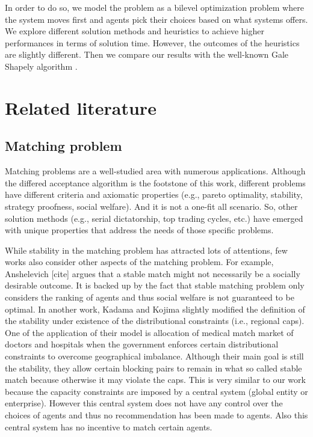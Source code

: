 \documentclass[11pt, letterpaper]{article}
\begin{document}
In order to do so, we model the problem as a bilevel optimization problem where the system moves first and agents pick their choices based on what systems offers. We explore different solution methods and heuristics to achieve higher performances in terms of solution time. However, the outcomes of the heuristics are slightly different. Then we compare our results with the well-known Gale Shapely algorithm \cite{gale1962college}.


\section{Related literature} \label {lit}
\subsection{Matching problem} 
Matching problems are a well-studied area with numerous applications. Although the differed acceptance algorithm \cite{gale1962college} is the footstone of this work, different problems have different criteria and axiomatic properties (e.g., pareto optimality, stability, strategy proofness, social welfare). And it is not a one-fit all scenario.  So, other solution methods (e.g., serial dictatorship, top trading cycles, etc.) have emerged with unique properties that address the needs of those specific problems. 

While stability in the matching problem has attracted lots of attentions, few works also consider other aspects of the matching problem. For example, Anshelevich  [cite] argues that a stable match might not necessarily be a socially desirable outcome. It is backed up by the fact that stable matching problem only considers the ranking of agents and thus social welfare is not guaranteed to be optimal. In another work, Kadama and Kojima  slightly modified the definition of the stability under existence of the distributional constraints (i.e., regional caps). One of the application of their model is allocation of medical match market of doctors and hospitals when the government enforces certain distributional constraints to overcome geographical imbalance. Although their main goal is still the stability, they allow certain blocking pairs to remain in what so called stable match because otherwise it may violate the caps. This is very similar to our work because the capacity constraints are imposed by a central system (global entity or enterprise). However this central system does not have any control over the choices of agents and thus no recommendation has been made to agents. Also this central system has no incentive to match certain agents. 
\end{document}
